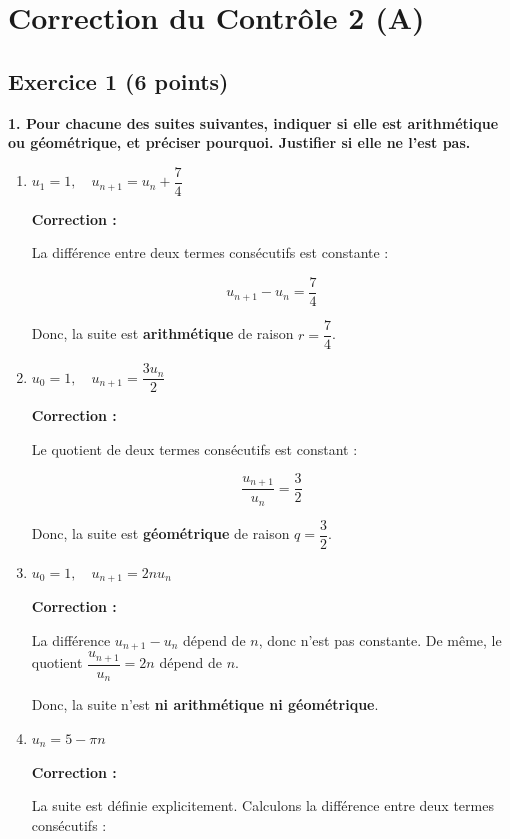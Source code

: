 \documentclass{article}
\begin{document}
\section*{Correction du Contrôle 2 (A)}

\subsection*{Exercice 1 (6 points)}

\textbf{1. Pour chacune des suites suivantes, indiquer si elle est arithmétique ou géométrique, et préciser pourquoi. Justifier si elle ne l'est pas.}

\begin{enumerate}[label=\alph*)]

\item \( u_1 = 1, \quad u_{n+1} = u_n + \dfrac{7}{4} \)

\textbf{Correction :}

La différence entre deux termes consécutifs est constante :

\[ u_{n+1} - u_n = \dfrac{7}{4} \]

Donc, la suite est \textbf{arithmétique} de raison \( r = \dfrac{7}{4} \).

\bigskip

\item \( u_0 = 1, \quad u_{n+1} = \dfrac{3 u_n}{2} \)

\textbf{Correction :}

Le quotient de deux termes consécutifs est constant :

\[ \dfrac{u_{n+1}}{u_n} = \dfrac{3}{2} \]

Donc, la suite est \textbf{géométrique} de raison \( q = \dfrac{3}{2} \).

\bigskip

\item \( u_0 = 1, \quad u_{n+1} = 2n u_n \)

\textbf{Correction :}

La différence \( u_{n+1} - u_n \) dépend de \( n \), donc n'est pas constante. De même, le quotient \( \dfrac{u_{n+1}}{u_n} = 2n \) dépend de \( n \).

Donc, la suite n'est \textbf{ni arithmétique ni géométrique}.

\bigskip

\item \( u_n = 5 - \pi n \)

\textbf{Correction :}

La suite est définie explicitement. Calculons la différence entre deux termes consécutifs :


\end{enumerate}
\end{document}
